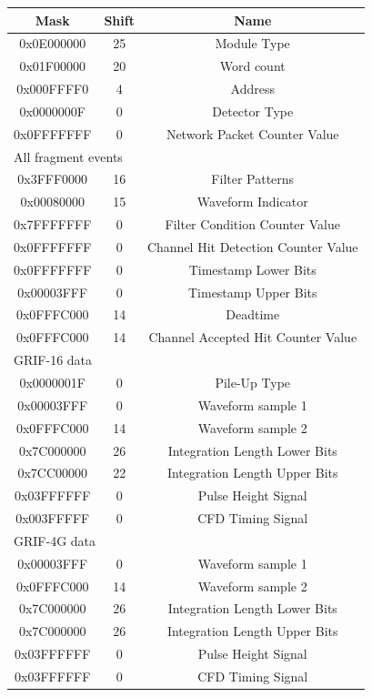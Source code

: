 \documentclass[letterpaper,12pt,notitlepage]{report}
\begin{document}
\begin{table}
\begin{center}
\begin{tabular}{ccc}
\hline
\hline
Mask & Shift & Name\\
\hline
0x0E000000 & 25 & Module Type\\
0x01F00000 & 20 & Word count\\
0x000FFFF0 & 4 & Address\\
0x0000000F & 0 & Detector Type\\
0x0FFFFFFF & 0 & Network Packet Counter Value\\
\hline
\multicolumn{3}{l}{All fragment events}\\
\hline
0x3FFF0000 & 16 & Filter Patterns\\
0x00080000 & 15 & Waveform Indicator\\
0x7FFFFFFF & 0 & Filter Condition Counter Value\\
0x0FFFFFFF & 0 & Channel Hit Detection Counter Value\\
0x0FFFFFFF & 0 & Timestamp Lower Bits\\
0x00003FFF & 0 & Timestamp Upper Bits\\
0x0FFFC000 & 14 & Deadtime\\
0x0FFFC000 & 14 & Channel Accepted Hit Counter Value\\
\hline
\multicolumn{3}{l}{GRIF-16 data}\\
\hline
0x0000001F & 0 & Pile-Up Type\\
0x00003FFF & 0 & Waveform sample 1\\
0x0FFFC000 & 14 & Waveform sample 2\\
0x7C000000 & 26 & Integration Length Lower Bits\\
0x7CC00000 & 22 & Integration Length Upper Bits\\
0x03FFFFFF & 0 & Pulse Height Signal\\
0x003FFFFF & 0 & CFD Timing Signal\\
\hline
\multicolumn{3}{l}{GRIF-4G data}\\
\hline
0x00003FFF & 0 & Waveform sample 1\\
0x0FFFC000 & 14 & Waveform sample 2\\
0x7C000000 & 26 & Integration Length Lower Bits\\
0x7C000000 & 26 & Integration Length Upper Bits\\
0x03FFFFFF & 0 & Pulse Height Signal\\
0x03FFFFFF & 0 & CFD Timing Signal\\

\end{tabular}
\end{center}
\end{table}
\end{document}
